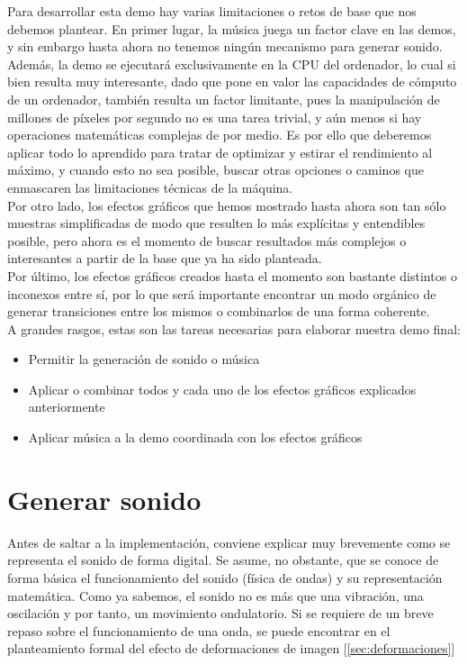 Para desarrollar esta demo hay varias limitaciones o retos de base que nos debemos plantear. En primer lugar, la música juega un factor clave en las demos, y sin embargo hasta ahora no tenemos ningún mecanismo para generar sonido.\\

Además, la demo se ejecutará exclusivamente en la CPU del ordenador, lo cual si bien resulta muy interesante, dado que pone en valor las capacidades de cómputo de un ordenador, también resulta un factor limitante, pues la manipulación de millones de píxeles por segundo no es una tarea trivial, y aún menos si hay operaciones matemáticas complejas de por medio. Es por ello que deberemos aplicar todo lo aprendido para tratar de optimizar y estirar el rendimiento al máximo, y cuando esto no sea posible, buscar otras opciones o caminos que enmascaren las limitaciones técnicas de la máquina.\\

Por otro lado, los efectos gráficos que hemos mostrado hasta ahora son tan sólo muestras simplificadas de modo que resulten lo más explícitas y entendibles posible, pero ahora es el momento de buscar resultados más complejos o interesantes a partir de la base que ya ha sido planteada.\\

Por último, los efectos gráficos creados hasta el momento son bastante distintos o inconexos entre sí, por lo que será importante encontrar un modo orgánico de generar transiciones entre los mismos o combinarlos de una forma coherente.\\

A grandes rasgos, estas son las tareas necesarias para elaborar nuestra demo final:

\begin{itemize}
	\item Permitir la generación de sonido o música
	\item Aplicar o combinar todos y cada uno de los efectos gráficos explicados anteriormente
	\item Aplicar música a la demo coordinada con los efectos gráficos
\end{itemize}

\section{Generar sonido}

Antes de saltar a la implementación, conviene explicar muy brevemente como se representa el sonido de forma digital. Se asume, no obstante, que se conoce de forma básica el funcionamiento del sonido (física de ondas) y su representación matemática. Como ya sabemos, el sonido no es más que una vibración, una oscilación y por tanto, un movimiento ondulatorio. Si se requiere de un breve repaso sobre el funcionamiento de una onda, se puede encontrar en el planteamiento formal del efecto de deformaciones de imagen [\ref{sec:deformaciones}]\\

